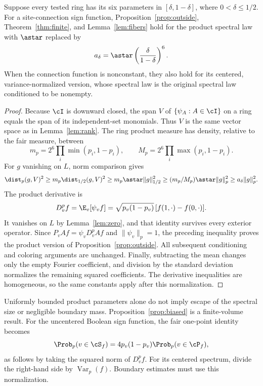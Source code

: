 \begin{proposition}\label{prop:biased}
Suppose every tested ring has its six parameters in $[\delta,1-\delta]$, where $0<\delta\le1/2$. For a site-connection sign function, Proposition~\ref{prop:outside}, Theorem~\ref{thm:finite}, and Lemma~\ref{lem:fibers} hold for the product spectral law with $\astar$ replaced by
\[
 a_\delta=\astar\left(\frac{\delta}{1-\delta}\right)^6.
\]
When the connection function is nonconstant, they also hold for its centered, variance-normalized version, whose spectral law is the original spectral law conditioned to be nonempty.
\end{proposition}
\begin{proof}
Because $\cI$ is downward closed, the span $V$ of $\{\psi_A:A\in\cI\}$ on a ring equals the span of its independent-set monomials. Thus $V$ is the same vector space as in Lemma~\ref{lem:rank}. The ring product measure has density, relative to the fair measure, between
\[
 m_p=2^6\prod_i\min(p_i,1-p_i),\qquad
 M_p=2^6\prod_i\max(p_i,1-p_i).
\]
For $g$ vanishing on $L$, norm comparison gives
\[
 \dist_p(g,V)^2
 \ge m_p\dist_{1/2}(g,V)^2
 \ge m_p\astar\|g\|_{1/2}^2
 \ge (m_p/M_p)\astar\|g\|_p^2
 \ge a_\delta\|g\|_p^2.
\]
The product derivative is
\[
 D_v^pf=\E_v[\psi_vf]
 =\sqrt{p_v(1-p_v)}\,[f(1,\cdot)-f(0,\cdot)].
\]
It vanishes on $L$ by Lemma~\ref{lem:zero}, and that identity survives every exterior operator. Since $P_vAf=\psi_vD_v^pAf$ and $\|\psi_v\|_p=1$, the preceding inequality proves the product version of Proposition~\ref{prop:outside}. All subsequent conditioning and coloring arguments are unchanged. Finally, subtracting the mean changes only the empty Fourier coefficient, and division by the standard deviation normalizes the remaining squared coefficients. The derivative inequalities are homogeneous, so the same constants apply after this normalization.
\end{proof}

Uniformly bounded product parameters alone do not imply escape of the spectral size or negligible boundary mass. Proposition~\ref{prop:biased} is a finite-volume result. For the uncentered Boolean sign function, the fair one-point identity becomes
\[
 \Prob_p(v\in\cS_f)=4p_v(1-p_v)\Prob_p(v\in\cP_f),
\]
as follows by taking the squared norm of $D_v^pf$. For its centered spectrum, divide the right-hand side by $\operatorname{Var}_p(f)$. Boundary estimates must use this normalization.


